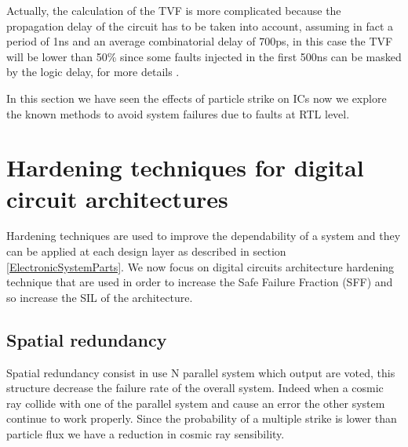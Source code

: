 {{{{				Actually, the calculation of the TVF is more complicated because the propagation delay of the circuit has to be taken into account, assuming in fact a period of 1ns and an average combinatorial delay of 700ps, in this case the TVF will be lower than 50\% since some faults injected in the first 500ns can be masked by the logic delay, for more details .
			}
				
			
		}%
			
			
	

		\vspace{1cm}
		
		In this section we have seen the effects of particle strike on ICs now we explore the known methods to avoid system failures due to faults at RTL level.
		\newpage
	}%
	\section{Hardening techniques for digital circuit architectures}{
		Hardening techniques are used to improve the dependability of a system and they can be applied at each design layer as described in section \ref{ElectronicSystemParts}. We now focus on digital circuits architecture hardening technique that  are used in order to increase the Safe Failure Fraction (SFF) and so increase the SIL of the architecture.
		
		\subsection{Spatial redundancy}{
		    Spatial redundancy consist in use N parallel system which output are voted, this structure decrease the failure rate of the overall system. Indeed when a cosmic ray collide with one of the parallel system and cause an error the other system continue to work properly. Since the probability of a multiple strike is lower than particle flux we have a reduction in cosmic ray sensibility. \\
		   
}}}
